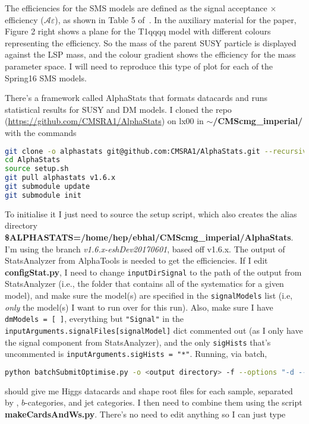The efficiencies for the SMS models are defined as the signal acceptance $\times$ efficiency ($\mathcal{A} \varepsilon$), as shown in Table 5 of~\cite{CMS-PAPER-SUS-15-005-arXiv}. In the auxiliary material for the paper, Figure 2 right shows a plane for the T1qqqq model with different colours representing the efficiency. So the mass of the parent SUSY particle is displayed against the LSP mass, and the colour gradient shows the efficiency for the mass parameter space. I will need to reproduce this type of plot for each of the Spring16 SMS models.

There's a framework called AlphaStats that formats datacards and runs statistical results for SUSY and DM models. I cloned the repo (\url{https://github.com/CMSRA1/AlphaStats}) on lx00 in \textbf{$\sim$/CMScmg\_imperial/} with the commands

\begin{lstlisting}[belowskip=-0.7cm, language=sh, numbers=none]
git clone -o alphastats git@github.com:CMSRA1/AlphaStats.git --recursive
cd AlphaStats
source setup.sh 
git pull alphastats v1.6.x
git submodule update
git submodule init
\end{lstlisting}

To initialise it I just need to source the setup script, which also creates the alias directory \textbf{\$ALPHASTATS=/home/hep/ebhal/CMScmg\_imperial/AlphaStats}. I'm using the branch \emph{v1.6.x-eshDev20170601}, based off v1.6.x. The output of StatsAnalyzer from AlphaTools is needed to get the efficiencies. If I edit \textbf{configStat.py}, I need to change \verb!inputDirSignal! to the path of the output from StatsAnalyzer (i.e., the folder that contains all of the systematics for a given model), and make sure the model(s) are specified in the \verb!signalModels! list (i.e, \emph{only} the model(s) I want to run over for this run). Also, make sure I have \texttt{dmModels = [ ]}, everything but \verb!"Signal"! in the \texttt{inputArguments.signalFiles[signalModel]} dict commented out (as I only have the signal component from StatsAnalyzer), and the only \texttt{sigHists} that's uncommented is \texttt{inputArguments.sigHists = "*"}. Running, via batch,

\begin{lstlisting}[belowskip=-0.7cm, language=sh, numbers=none]
python batchSubmitOptimise.py -o <output directory> -f --options "-d --getDataLumi --greenBand --signalMCStat" --submit
\end{lstlisting}

should give me Higgs datacards and shape root files for each sample, separated by \HT, $b$-categories, and jet categories. I then need to combine them using the script \textbf{makeCardsAndWs.py}. There's no need to edit anything so I can just type

